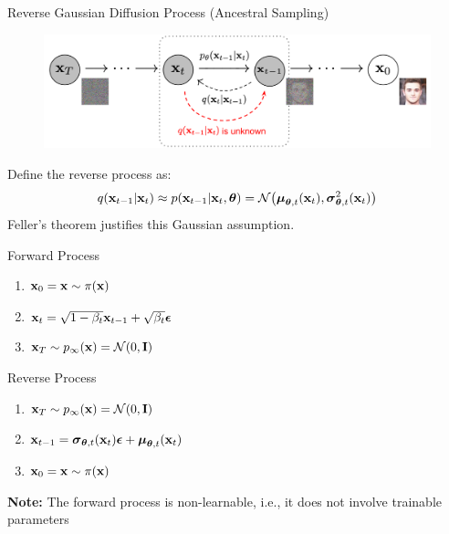 \documentclass{beamer}
\begin{document}
\begin{frame}{Reverse Gaussian Diffusion Process (Ancestral Sampling)}
	\vspace{-0.3cm} 
	\begin{figure}
		\includegraphics[width=0.8\linewidth]{figs/DDPM}
	\end{figure}
	\vspace{-0.3cm} 
	Define the reverse process as: 
	\vspace{-0.2cm}
	\[
		q(\mathbf{x}_{t-1}|\mathbf{x}_{t}) \approx p(\mathbf{x}_{t - 1} | \mathbf{x}_t, \boldsymbol{\theta}) = \mathcal{N}\bigl(\boldsymbol{\mu}_{\boldsymbol{\theta}, t}(\mathbf{x}_t), \boldsymbol{\sigma}^2_{\boldsymbol{\theta}, t}(\mathbf{x}_t)\bigr)
	\]
	{\color{gray}Feller's theorem justifies this Gaussian assumption.}
	\eqpause
	\begin{minipage}{0.5\linewidth}
		\begin{block}{Forward Process}
			\begin{enumerate}
				\item $\mathbf{x}_0 = \mathbf{x} \sim \pi(\mathbf{x})$
				\item $\mathbf{x}_t = \sqrt{1 - \beta_t} \mathbf{x}_{t-1} + \sqrt{\beta_t} \boldsymbol{\epsilon}$
				\item $\mathbf{x}_T \sim p_\infty(\mathbf{x}) = \mathcal{N}(0, \mathbf{I})$
			\end{enumerate}
		\end{block}
	\end{minipage}%
    \eqpause
	\begin{minipage}{0.55\linewidth}
		\begin{block}{Reverse Process}
			\begin{enumerate}
				\item $\mathbf{x}_T \sim p_\infty(\mathbf{x}) = \mathcal{N}(0, \mathbf{I})$
				\item $\mathbf{x}_{t-1} = \boldsymbol{\sigma}_{\boldsymbol{\theta}, t}(\mathbf{x}_t) \boldsymbol{\epsilon} + \boldsymbol{\mu}_{\boldsymbol{\theta}, t}(\mathbf{x}_t)$
				\item $\mathbf{x}_0 = \mathbf{x} \sim \pi(\mathbf{x})$
			\end{enumerate}
		\end{block}
	\end{minipage}
    \eqpause
	\textbf{Note:} The forward process is non-learnable, i.e., it does not involve trainable parameters
\end{frame}
\end{document}
